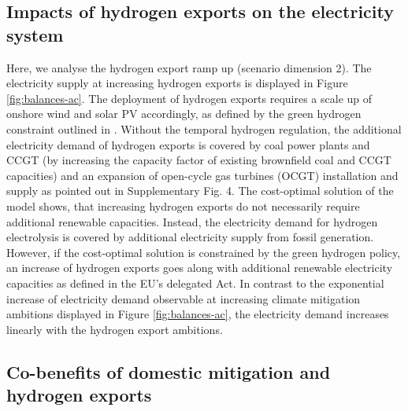 \subsection*{Impacts of hydrogen exports on the electricity system}
\label{subsec:increase_h2}

Here, we analyse the hydrogen export ramp up (scenario dimension 2). The electricity supply at increasing hydrogen exports is displayed in Figure \ref{fig:balances-ac}. The deployment of hydrogen exports requires a scale up of onshore wind and solar PV accordingly, as defined by the green hydrogen constraint outlined in .
Without the temporal hydrogen regulation, the additional electricity demand of hydrogen exports is covered by coal power plants and CCGT (by increasing the capacity factor of existing brownfield coal and CCGT capacities) and an expansion of open-cycle gas turbines (OCGT) installation and supply as pointed out in Supplementary Fig. 4. %
The cost-optimal solution of the model shows, that increasing hydrogen exports do not necessarily require additional renewable capacities. Instead, the electricity demand for hydrogen electrolysis is covered by additional electricity supply from fossil generation. However, if the cost-optimal solution is constrained by the green hydrogen policy, an increase of hydrogen exports goes along with additional renewable electricity capacities as defined in the EU's delegated Act.
In contrast to the exponential increase of electricity demand observable at increasing climate mitigation ambitions displayed in Figure \ref{fig:balances-ac}, the electricity demand increases linearly with the hydrogen export ambitions.




\subsection*{Co-benefits of domestic \co mitigation and hydrogen exports}
\label{subsec:benefits}

